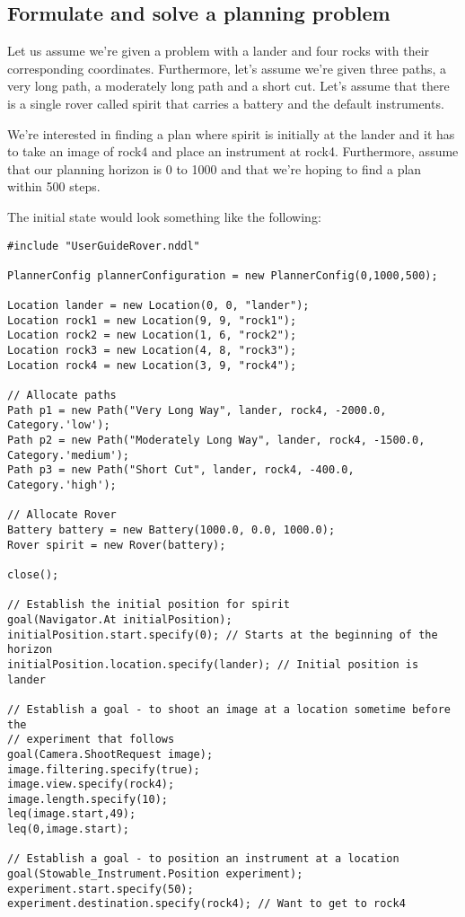 \documentclass[10pt, letterpaper, twoside]{article}
\begin{document}
\subsection{Formulate and solve a planning problem}

Let us assume we're given a problem with a lander and four rocks with their
corresponding coordinates.  Furthermore, let's assume we're given three
paths, a very long path, a moderately long path and a short cut.  Let's
assume that there is a single rover called spirit that carries a battery
and the default instruments.

We're interested in finding a plan where spirit is initially at the lander
and it has to take an image of rock4 and place an instrument at rock4.
Furthermore, assume that our planning horizon is 0 to 1000 and that we're
hoping to find a plan within 500 steps.

The initial state would look something like the following:
\begin{verbatim}
#include "UserGuideRover.nddl"

PlannerConfig plannerConfiguration = new PlannerConfig(0,1000,500);

Location lander = new Location(0, 0, "lander");
Location rock1 = new Location(9, 9, "rock1");
Location rock2 = new Location(1, 6, "rock2");
Location rock3 = new Location(4, 8, "rock3");
Location rock4 = new Location(3, 9, "rock4");

// Allocate paths
Path p1 = new Path("Very Long Way", lander, rock4, -2000.0, Category.'low');
Path p2 = new Path("Moderately Long Way", lander, rock4, -1500.0, Category.'medium');
Path p3 = new Path("Short Cut", lander, rock4, -400.0, Category.'high');

// Allocate Rover
Battery battery = new Battery(1000.0, 0.0, 1000.0);
Rover spirit = new Rover(battery);

close();

// Establish the initial position for spirit
goal(Navigator.At initialPosition);
initialPosition.start.specify(0); // Starts at the beginning of the horizon
initialPosition.location.specify(lander); // Initial position is lander

// Establish a goal - to shoot an image at a location sometime before the
// experiment that follows
goal(Camera.ShootRequest image);
image.filtering.specify(true);
image.view.specify(rock4);
image.length.specify(10);
leq(image.start,49);
leq(0,image.start);

// Establish a goal - to position an instrument at a location
goal(Stowable_Instrument.Position experiment);
experiment.start.specify(50);
experiment.destination.specify(rock4); // Want to get to rock4
\end{verbatim}
\end{document}
